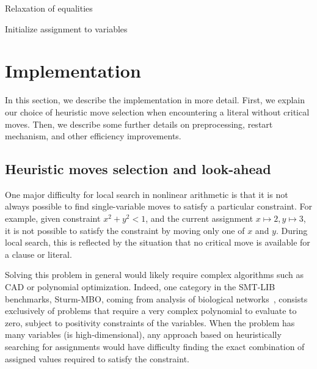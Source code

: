\documentclass[runningheads]{llncs}
\begin{document}
\begin{algorithm}[h!]
\caption{Relaxation of equalities}
\label{alg:relax}
Initialize assignment to variables\; 
\end{algorithm}

\section{Implementation}
\label{sec:implementation}

In this section, we describe the implementation in more detail. First, we explain our choice of heuristic move selection when encountering a literal without critical moves. Then, we describe some further details on preprocessing, restart mechanism, and other efficiency improvements.

\subsection{Heuristic moves selection and look-ahead}

One major difficulty for local search in nonlinear arithmetic is that it is not always possible to find single-variable moves to satisfy a particular constraint. For example, given constraint $x^2+y^2<1$, and the current assignment $x\mapsto 2, y\mapsto 3$, it is not possible to satisfy the constraint by moving only one of $x$ and $y$. During local search, this is reflected by the situation that no critical move is available for a clause or literal.

Solving this problem in general would likely require complex algorithms such as CAD or polynomial optimization. Indeed, one category in the SMT-LIB benchmarks, \textsf{Sturm-MBO}, coming from analysis of biological networks~\cite{AkutsuHT08}, consists exclusively of problems that require a very complex polynomial to evaluate to zero, subject to positivity constraints of the variables. When the problem has many variables (is high-dimensional), any approach based on heuristically searching for assignments would have difficulty finding the exact combination of assigned values required to satisfy the constraint.
\end{document}

